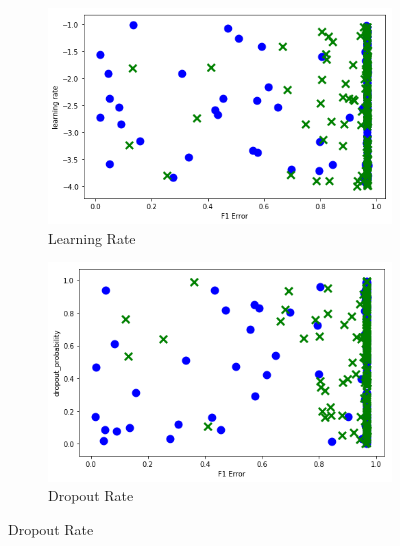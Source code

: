 \begin{figure}[H]
     \centering
     \begin{subfigure}[b]{0.49\textwidth}
         \centering
         \includegraphics[width=\textwidth]{images/cnn_learning_rate_dummy.png}
         \caption{Learning Rate}
         \label{fig:cnn_learning_rate_learning}
     \end{subfigure}
     \hfill
     \begin{subfigure}[b]{0.49\textwidth}
         \centering
         \includegraphics[width=\textwidth]{images/cnn_dropout_dummy.png}
         \caption{Dropout Rate}
         \label{fig:cnn_dropout_learning}
     \end{subfigure}


\end{figure}
